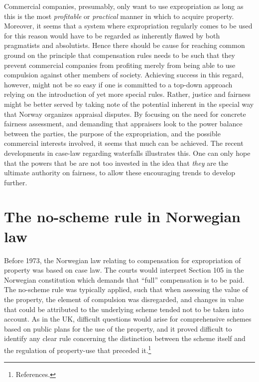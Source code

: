 Commercial companies, presumably, only want to use expropriation as long as this is the most \emph{profitable} or \emph{practical} manner in which to acquire property. Moreover, it seems that a system where expropriation regularly comes to be used for this reason would have to be regarded as inherently flawed by both pragmatists and absolutists. Hence there should be cause for reaching common ground on the principle that compensation rules needs to be such that they prevent commercial companies from profiting merely from being able to use compulsion against other members of society. Achieving success in this regard, however, might not be so easy if one is committed to a top-down approach relying on the introduction of yet more special rules. Rather, justice and fairness might be better served by taking note of the potential inherent in the special way that Norway organizes appraisal disputes. By focusing on the need for concrete fairness assessment, and demanding that appraisers look to the power balance between the parties, the purpose of the expropriation, and the possible commercial interests involved, it seems that much can be achieved. The recent developments in case-law regarding waterfalls illustrates this. One can only hope that the powers that be are not too invested in the idea that \emph{they} are the ultimate authority on fairness, to allow these 
encouraging trends to develop further.




\section{The no-scheme rule in Norwegian law}\label{sec:nonor}

Before 1973, the Norwegian law relating to compensation for expropriation of property was based on case law. The courts would interpret Section 105 in the Norwegian constitution which demands that ``full'' compensation is to be paid. The no-scheme rule was typically applied, such that when assessing the value of the property, the element of compulsion was disregarded, and changes in value that could be attributed to the underlying scheme tended not to be taken into account. As in the UK, difficult questions would arise for comprehensive schemes based on public plans for the use of the property, and it proved difficult to identify any clear rule concerning the distinction between the scheme itself and the regulation of property-use that preceded it.\footnote{References.}


